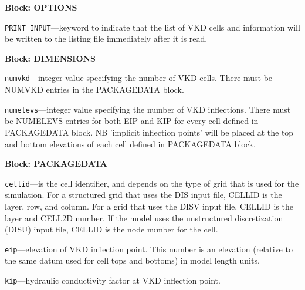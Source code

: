 
\item \textbf{Block: OPTIONS}

\begin{description}
\item \texttt{PRINT\_INPUT}---keyword to indicate that the list of VKD cells and information will be written to the listing file immediately after it is read.

\end{description}
\item \textbf{Block: DIMENSIONS}

\begin{description}
\item \texttt{numvkd}---integer value specifying the number of VKD cells. There must be NUMVKD entries in the PACKAGEDATA block.

\item \texttt{numelevs}---integer value specifying the number of VKD inflections. There must be NUMELEVS entries for both EIP and KIP for every cell defined in PACKAGEDATA block. NB 'implicit inflection points' will be placed at the top and bottom elevations of each cell defined in PACKAGEDATA block.

\end{description}
\item \textbf{Block: PACKAGEDATA}

\begin{description}
\item \texttt{cellid}---is the cell identifier, and depends on the type of grid that is used for the simulation.  For a structured grid that uses the DIS input file, CELLID is the layer, row, and column.   For a grid that uses the DISV input file, CELLID is the layer and CELL2D number.  If the model uses the unstructured discretization (DISU) input file, CELLID is the node number for the cell.

\item \texttt{eip}---elevation of VKD inflection point.  This number is an elevation (relative to the same datum used for cell tops and bottoms) in model length units.

\item \texttt{kip}---hydraulic conductivity factor at VKD inflection point.

\end{description}

